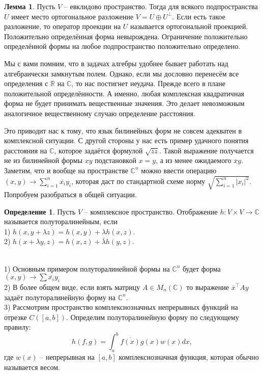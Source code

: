 \documentclass[10pt,a4paper,oneside]{book} %
\theoremstyle{definition}
\newtheorem*{defn}{Определение}
\newtheorem{lem}{Лемма}
\newcommand{\mb}[1]{\mathbb{#1}}
\newcommand{\ovl}{\overline}
\def\exm{\noindent {\bf Примеры:}}
\def\dfn{\begin{defn}}
\def\edfn{\end{defn}}
\def\lm{\begin{lem}}
\def\elm{\end{lem}}
\begin{document}
 
\lm Пусть $V$ -- евклидово пространство. Тогда для всякого подпространства $U$ имеет место ортогональное разложение $V=U\oplus U^{\bot}$. Если есть такое разложение, то оператор проекции на $U$ называется ортогональной проекцией.
\proof Положительно определённая форма невырождена. Ограничение положительно определённой формы на любое подпространство положительно определено.
\endproof
\elm

Мы с вами помним, что в задачах алгебры  удобнее бывает работать над алгебраически замкнутым полем. Однако, если мы дословно перенесём все определения с $\mb R$ на $\mb C$, то нас постигнет неудача. Прежде всего в плане положительной определённости. А именно, любая комплексная квадратичная форма не будет принимать вещественные значения. Это делает невозможным аналогичное вещественному случаю определение расстояния. 

Это приводит нас к тому, что язык билинейных форм не совсем адекватен в комплексной ситуации. С другой стороны у нас есть пример удачного понятия расстояния на $\mb C$, которое задаётся формулой $\sqrt{\ovl{z}z}$. Такой выражение получается не из билинейной формы $xy$ подстановкой $x=y$, а из менее ожидаемого $\ovl{x}y$. Заметим, что и вообще на пространстве $\mb C^n$ можно ввести операцию $
(x,y) \to \sum_{i=1}^n \ovl{x_i}y_i$, которая даст по стандартной схеме норму $\sqrt{\sum_{i=1}^n |x_i|^2}$. Попробуем разобраться в общей ситуации.

\dfn Пусть $V$ -- комплексное пространство.  Отображение $h\colon V \times V \to \mb C$ называется полуторалинейным, если \\
1) $h(x,y+\lambda z)=h(x,y)+\lambda h(x,z)$. \\
2) $h(x+\lambda y,z)=h(x,z)+\ovl{\lambda} h(y,z)$.
\edfn

\exm\\
1) Основным примером полуторалинейной формы на $\mb C^n$ будет форма $(x,y)\to \sum \ovl{x_i}y_i$\\
2) В более общем виде, если взять матрицу $A\in M_n(\mb C)$  то выражение $\ovl{x}^{\top}Ay$ задаёт полуторалинейную форму на $\mb C^n$.\\
3) Рассмотрим пространство комплекснозначных непрерывных функций на отрезке $C([a,b])$. Определим полуторалинейную форму по следующему правилу:
$$h(f,g)=\int_a^b \ovl{f(x)}g(x)w(x)dx,$$
где $w(x)$ -- непрерывная на $[a,b]$ комплекснозначная функция, которая обычно называется весом.\\
\end{document}
